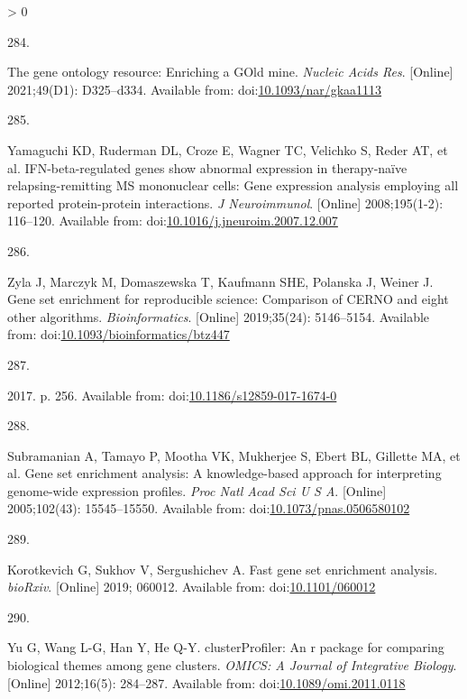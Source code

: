 \documentclass[twoside,10pt]{gihclass} %
\newlength{\cslhangindent}
\newlength{\csllabelwidth}
\newenvironment{CSLReferences}[3] %
 {%
  \setlength{\parindent}{0pt}
  \ifodd #1 \everypar{\setlength{\hangindent}{\cslhangindent}}\ignorespaces\fi
  \ifnum #2 > 0
  \setlength{\parskip}{#2\baselineskip}
  \fi
 }%
 {}
\newcommand{\CSLLeftMargin}[1]{\parbox[t]{\maxof{\widthof{#1}}{\csllabelwidth}}{#1}}
\newcommand{\CSLRightInline}[1]{\parbox[t]{\linewidth}{#1}}
\begin{document}
\begin{CSLReferences}{0}{0}
\leavevmode\hypertarget{ref-RN2890}{}%
\CSLLeftMargin{284. }
\CSLRightInline{The gene ontology resource: Enriching a GOld mine. \emph{Nucleic Acids Res}. {[}Online{]} 2021;49(D1): D325--d334. Available from: doi:\href{https://doi.org/10.1093/nar/gkaa1113}{10.1093/nar/gkaa1113}}

\leavevmode\hypertarget{ref-RN2439}{}%
\CSLLeftMargin{285. }
\CSLRightInline{Yamaguchi KD, Ruderman DL, Croze E, Wagner TC, Velichko S, Reder AT, et al. IFN-beta-regulated genes show abnormal expression in therapy-naïve relapsing-remitting MS mononuclear cells: Gene expression analysis employing all reported protein-protein interactions. \emph{J Neuroimmunol}. {[}Online{]} 2008;195(1-2): 116--120. Available from: doi:\href{https://doi.org/10.1016/j.jneuroim.2007.12.007}{10.1016/j.jneuroim.2007.12.007}}

\leavevmode\hypertarget{ref-RN2438}{}%
\CSLLeftMargin{286. }
\CSLRightInline{Zyla J, Marczyk M, Domaszewska T, Kaufmann SHE, Polanska J, Weiner J. Gene set enrichment for reproducible science: Comparison of CERNO and eight other algorithms. \emph{Bioinformatics}. {[}Online{]} 2019;35(24): 5146--5154. Available from: doi:\href{https://doi.org/10.1093/bioinformatics/btz447}{10.1093/bioinformatics/btz447}}

\leavevmode\hypertarget{ref-RN2435}{}%
\CSLLeftMargin{287. }
\CSLRightInline{2017. p. 256. Available from: doi:\href{https://doi.org/10.1186/s12859-017-1674-0}{10.1186/s12859-017-1674-0}}

\leavevmode\hypertarget{ref-RN2432}{}%
\CSLLeftMargin{288. }
\CSLRightInline{Subramanian A, Tamayo P, Mootha VK, Mukherjee S, Ebert BL, Gillette MA, et al. Gene set enrichment analysis: A knowledge-based approach for interpreting genome-wide expression profiles. \emph{Proc Natl Acad Sci U S A}. {[}Online{]} 2005;102(43): 15545--15550. Available from: doi:\href{https://doi.org/10.1073/pnas.0506580102}{10.1073/pnas.0506580102}}

\leavevmode\hypertarget{ref-RN2434}{}%
\CSLLeftMargin{289. }
\CSLRightInline{Korotkevich G, Sukhov V, Sergushichev A. Fast gene set enrichment analysis. \emph{bioRxiv}. {[}Online{]} 2019; 060012. Available from: doi:\href{https://doi.org/10.1101/060012}{10.1101/060012}}

\leavevmode\hypertarget{ref-clusterProfiler}{}%
\CSLLeftMargin{290. }
\CSLRightInline{Yu G, Wang L-G, Han Y, He Q-Y. clusterProfiler: An r package for comparing biological themes among gene clusters. \emph{OMICS: A Journal of Integrative Biology}. {[}Online{]} 2012;16(5): 284--287. Available from: doi:\href{https://doi.org/10.1089/omi.2011.0118}{10.1089/omi.2011.0118}}


\end{CSLReferences}
\end{document}

